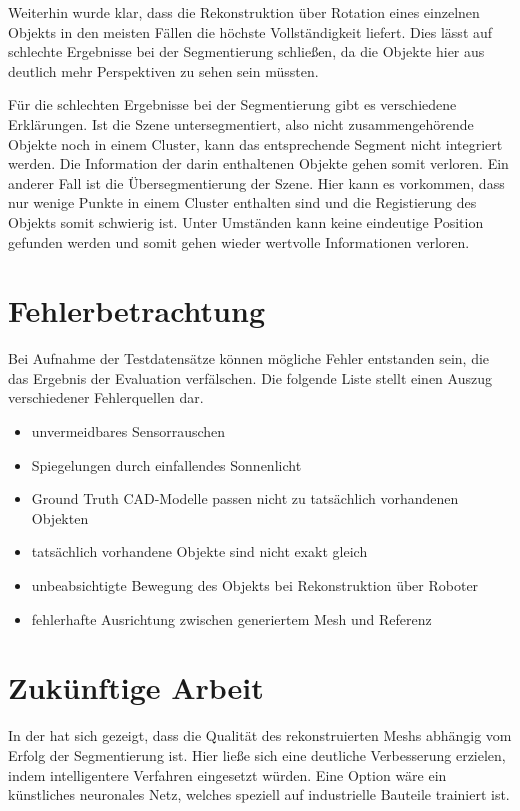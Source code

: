 Weiterhin wurde klar, dass die Rekonstruktion über Rotation eines einzelnen Objekts in den meisten Fällen die höchste Vollständigkeit liefert.
Dies lässt auf schlechte Ergebnisse bei der Segmentierung schließen, da die Objekte hier aus deutlich mehr Perspektiven zu sehen sein müssten.

Für die schlechten Ergebnisse bei der Segmentierung gibt es verschiedene Erklärungen.
Ist die Szene untersegmentiert, also nicht zusammengehörende Objekte noch in einem Cluster, kann das entsprechende Segment nicht integriert werden.
Die Information der darin enthaltenen Objekte gehen somit verloren.
Ein anderer Fall ist die Übersegmentierung der Szene.
Hier kann es vorkommen, dass nur wenige Punkte in einem Cluster enthalten sind und die Registierung des Objekts somit schwierig ist.
Unter Umständen kann keine eindeutige Position gefunden werden und somit gehen wieder wertvolle Informationen verloren.



\section{Fehlerbetrachtung}
\label{sec:auswertung-fehler}

Bei Aufnahme der Testdatensätze können mögliche Fehler entstanden sein, die das Ergebnis der Evaluation verfälschen.
Die folgende Liste stellt einen Auszug verschiedener Fehlerquellen dar.

\begin{itemize}
    \item unvermeidbares Sensorrauschen
    \item Spiegelungen durch einfallendes Sonnenlicht
    \item Ground Truth CAD-Modelle passen nicht zu tatsächlich vorhandenen Objekten
    \item tatsächlich vorhandene Objekte sind nicht exakt gleich
    \item unbeabsichtigte Bewegung des Objekts bei Rekonstruktion über Roboter
    \item fehlerhafte Ausrichtung zwischen generiertem Mesh und Referenz
\end{itemize}



\section{Zukünftige Arbeit}
\label{sec:auswertung-zukunft}

In der  hat sich gezeigt, dass die Qualität des rekonstruierten Meshs abhängig vom Erfolg der Segmentierung ist.
Hier ließe sich eine deutliche Verbesserung erzielen, indem intelligentere Verfahren eingesetzt würden.
Eine Option wäre ein künstliches neuronales Netz, welches speziell auf industrielle Bauteile trainiert ist.

